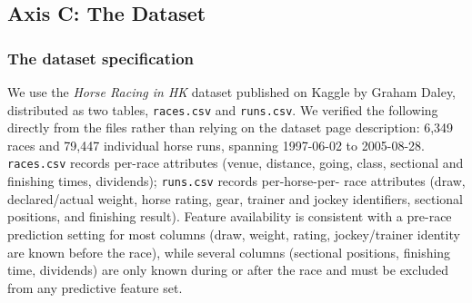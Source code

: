 \subsection{Axis C: The Dataset}
\label{sec:ejeC}

\subsubsection*{\textbf{The dataset specification}} We use the \textit{Horse Racing in HK}
dataset published on Kaggle by Graham Daley, distributed as two tables,
\texttt{races.csv} and \texttt{runs.csv}. We verified the following directly from
the files rather than relying on the dataset page description: 6,349 races and
79,447 individual horse runs, spanning 1997-06-02 to 2005-08-28.
\texttt{races.csv} records per-race attributes (venue, distance, going, class,
sectional and finishing times, dividends); \texttt{runs.csv} records per-horse-per-
race attributes (draw, declared/actual weight, horse rating, gear, trainer and
jockey identifiers, sectional positions, and finishing result). Feature
availability is consistent with a pre-race prediction setting for most columns
(draw, weight, rating, jockey/trainer identity are known before the race), while
several columns (sectional positions, finishing time, dividends) are only known
during or after the race and must be excluded from any predictive feature set.

